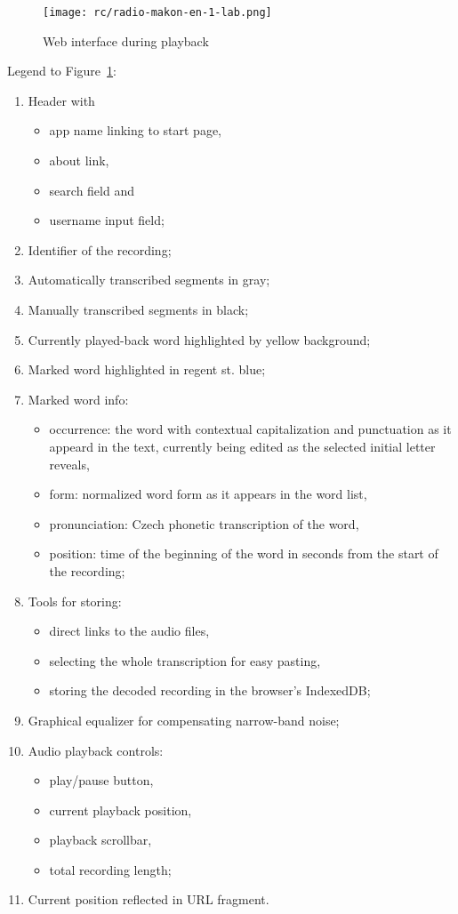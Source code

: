 \documentclass{llncs}
\begin{document}
\begin{figure}[htpb]
\texttt{[image: rc/radio-makon-en-1-lab.png]}
\caption{Web interface during playback}
\label{fig:scn1lab}
\end{figure}

Legend to Figure~\ref{fig:scn1lab}:
\begin{enumerate}
\item{
    Header with
    \begin{itemize}
    \item{app name linking to start page,}
    \item{about link,}
    \item{search field and}
    \item{username input field;}
    \end{itemize}
}
\item{Identifier of the recording;}
\item{Automatically transcribed segments in gray;}
\item{Manually transcribed segments in black;}
\item{Currently played-back word highlighted by yellow background;}
\item{Marked word highlighted in regent st. blue;}
\item{
    Marked word info:
    \begin{itemize}
    \item{
        occurrence: the word with contextual capitalization and
        punctuation as it appeard in the text, currently being edited as the
        selected initial letter reveals,
    }
    \item{form: normalized word form as it appears in the word list,}
    \item{pronunciation: Czech phonetic transcription of the word,}
    \item{
        position: time of the beginning of the word in seconds from the
        start of the recording;
    }
    \end{itemize}
}
\item{
    Tools for storing:
    \begin{itemize}
    \item{direct links to the audio files,}
    \item{selecting the whole transcription for easy pasting,}
    \item{storing the decoded recording in the browser's IndexedDB;}
    \end{itemize}
}
\item{Graphical equalizer for compensating narrow-band noise;}
\item{
    Audio playback controls:
    \begin{itemize}
    \item{play/pause button,}
    \item{current playback position,}
    \item{playback scrollbar,}
    \item{total recording length;}
    \end{itemize}
}
\item{Current position reflected in URL fragment.}
\end{enumerate}
\end{document}
